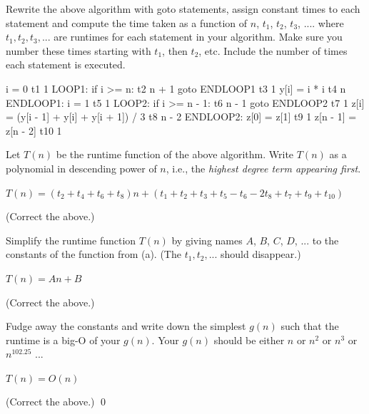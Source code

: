 \nextq
Rewrite the above algorithm with
goto statements, assign constant times to each statement and
compute the time taken as a function of $n$, $t_1$, $t_2$, $t_3$, ....
where $t_1, t_2, t_3, ...$ are runtimes for each statement in your
algorithm. Make sure you
number these times starting with $t_1$, then
$t_2$, etc.
Include the number of times each statement is executed.
\\
\ANSWER
\begin{answercode}
          i = 0                   t1      1
LOOP1:    if i >= n:              t2      n + 1
              goto ENDLOOP1       t3      1
          y[i] = i * i            t4      n
ENDLOOP1: i = 1                   t5      1
LOOP2:    if i >= n - 1:          t6      n - 1
              goto ENDLOOP2       t7      1
          z[i] = (y[i - 1] + y[i] + y[i + 1]) / 3      t8      n - 2    
ENDLOOP2: z[0] = z[1]             t9      1
          z[n - 1] = z[n - 2]     t10     1
\end{answercode}

\nextq
Let $T(n)$ be the runtime function of the above algorithm.
Write $T(n)$ as a polynomial in descending power of $n$, i.e.,
the \textit{highest degree term appearing first}.
\\
\ANSWER
\begin{answerlong}
$T(n) = (t_2 + t_4 + t_6 + t_8)n + (t_1 + t_2 + t_3 + t_5 - t_6 - 2t_8 + t_7 + t_9 + t_{10})$
\end{answerlong}
(Correct the above.)

\nextq
Simplify the runtime function $T(n)$
by giving names $A$, $B$, $C$, $D$, ...
to the constants of the function from (a). (The $t_1, t_2, ...$ should
disappear.)
\\
\ANSWER
\begin{answerlong}
$T(n) = An + B$
\end{answerlong}
(Correct the above.)

\nextq
Fudge away the constants and write down the simplest $g(n)$ such
that the runtime is a big-O of your $g(n)$.
Your $g(n)$ should be either $n$ or $n^2$ or $n^3$ or $n^{102.25}$ ...
\\
\ANSWER
\begin{answerlong}
$T(n) = O(n)$
\end{answerlong}
(Correct the above.)
\qed



